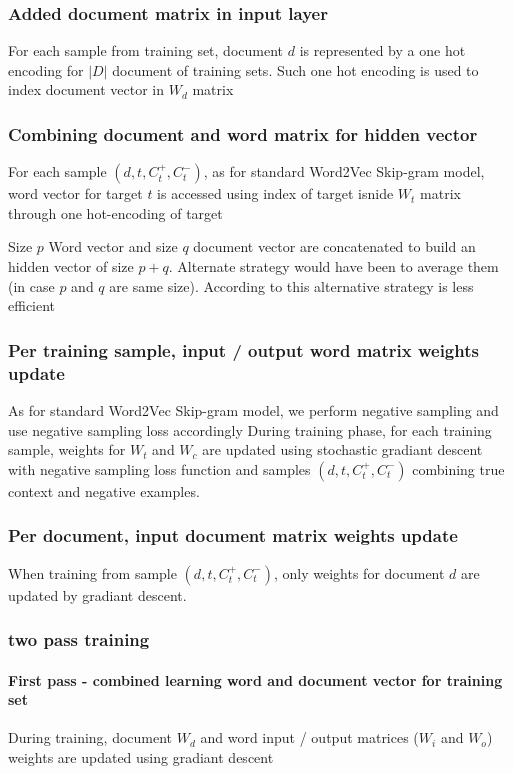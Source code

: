 \documentclass[a4paper]{article}
\begin{document}
\subsubsection{Added document matrix in input layer}
For each sample from training set,  document $d$ is represented by a one hot encoding for $\vert D \vert$ document of training sets. Such one hot encoding is used to index document vector in $W_{d}$ matrix

\subsubsection{Combining document and word matrix for hidden vector}
For each sample $(d,t,C_{t}^{+},C_{t}^{-})$, as for standard Word2Vec Skip-gram model, word vector for target $t$ is accessed using index of target isnide $W_{t}$ matrix through one hot-encoding of target

Size $p$ Word vector and size $q$ document vector are concatenated to build an hidden vector of size $p + q$. Alternate strategy would have been to average them (in case $p$ and $q$ are same size). According to \citep{quocLe2014doc2vec} this alternative strategy is less efficient

\subsubsection{Per training sample, input / output word matrix weights update}
As for standard Word2Vec Skip-gram model, we perform negative sampling and use negative sampling loss accordingly
During training phase, for each training sample, weights for $W_{t}$ and $W_{c}$ are updated using stochastic gradiant descent with negative sampling loss function and samples $(d,t,C_{t}^{+},C_{t}^{-})$ combining true context and negative examples.

\subsubsection{Per document, input document matrix weights update}
When training from sample $(d,t,C_{t}^{+},C_{t}^{-})$, only weights for document $d$ are updated by gradiant descent. 

\subsubsection{two pass training}

\paragraph{ First pass - combined learning word and document vector for training set}
During  training, document $W_{d}$ and word input / output matrices ($W_{i}$ and $W_{o}$) weights are updated using gradiant descent
\end{document}
